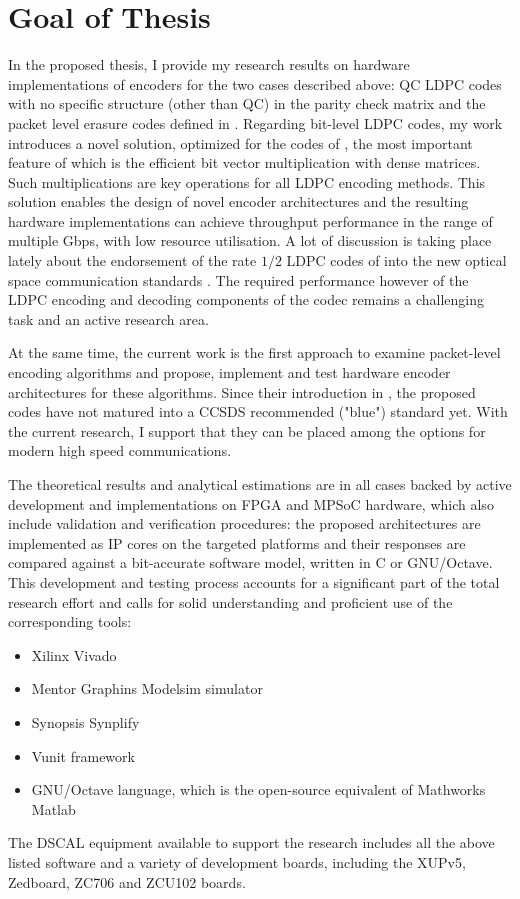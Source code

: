 \section{Goal of Thesis}
\label{sec:goal}
In the proposed thesis, I provide my research results on hardware implementations of encoders for the two cases described above: QC LDPC codes with no specific structure (other than QC) in the parity check matrix and the packet level erasure codes defined in \cite{CCSDS131.5}.
Regarding bit-level LDPC codes, my work introduces a novel solution, optimized for the codes of \cite{CCSDS131.0}, the most important feature of which is the efficient bit vector multiplication with dense matrices. Such multiplications are key operations for all LDPC encoding methods. This solution enables the design of novel encoder architectures and the resulting hardware implementations can achieve throughput performance in the range of multiple Gbps, with low resource utilisation. A lot of discussion is taking place lately about the endorsement of the rate $1/2$ LDPC codes of \cite{CCSDS131.0} into the new optical space communication standards \cite{CCSDS141}. The required performance however of the LDPC encoding and decoding components of the codec remains a challenging task and an active research area.\par
At the same time, the current work is the first approach to examine packet-level encoding algorithms and propose, implement and test hardware encoder architectures for these algorithms. Since their introduction in \cite{CCSDS131.5}, the proposed codes have not matured into a CCSDS recommended ("blue") standard yet. With the current research, I support that they can be placed among the options for modern high speed communications.\par
The theoretical results and analytical estimations are in all cases backed by active development and implementations on FPGA and MPSoC hardware, which also include validation and verification procedures: the proposed architectures are implemented as IP cores on the targeted platforms and their responses are compared against a bit-accurate software model, written in C or GNU/Octave. This development and testing process accounts for a significant part of the total research effort and calls for solid understanding and proficient use of the corresponding tools:
\begin{itemize}
    \item Xilinx Vivado
    \item Mentor Graphins Modelsim simulator
    \item Synopsis Synplify
    \item Vunit framework \cite{Vunit21}
    \item GNU/Octave language, which is the open-source equivalent of Mathworks Matlab
\end{itemize}
The DSCAL equipment available to support the research includes all the above listed software and a variety of development boards, including the XUPv5, Zedboard, ZC706 and ZCU102 boards.